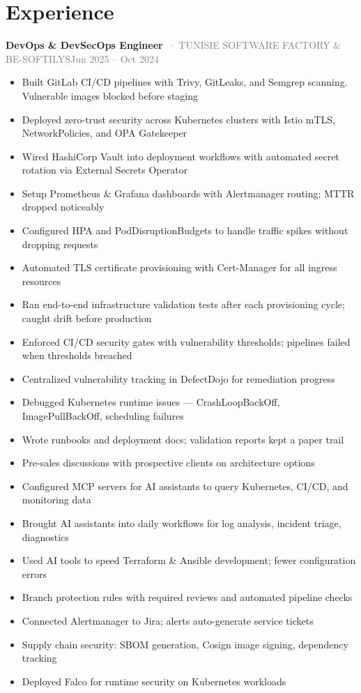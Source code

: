 \documentclass[10pt,a4paper]{article}
\newcommand{\cventry}[3]{\textbf{#1}\ \textcolor{graytext}{· #2}\hfill\textcolor{graytext}{\small #3}\par}
\begin{document}
\section*{Experience}
\cventry{DevOps \& DevSecOps Engineer}{TUNISIE SOFTWARE FACTORY \& BE-SOFTILYS}{Jun 2025 – Oct 2024}
\begin{itemize}
  \item Built GitLab CI/CD pipelines with Trivy, GitLeaks, and Semgrep scanning. Vulnerable images blocked before staging
  \item Deployed zero-trust security across Kubernetes clusters with Istio mTLS, NetworkPolicies, and OPA Gatekeeper
  \item Wired HashiCorp Vault into deployment workflows with automated secret rotation via External Secrets Operator
  \item Setup Prometheus \& Grafana dashboards with Alertmanager routing; MTTR dropped noticeably
  \item Configured HPA and PodDisruptionBudgets to handle traffic spikes without dropping requests
  \item Automated TLS certificate provisioning with Cert-Manager for all ingress resources
  \item Ran end-to-end infrastructure validation tests after each provisioning cycle; caught drift before production
  \item Enforced CI/CD security gates with vulnerability thresholds; pipelines failed when thresholds breached
  \item Centralized vulnerability tracking in DefectDojo for remediation progress
  \item Debugged Kubernetes runtime issues — CrashLoopBackOff, ImagePullBackOff, scheduling failures
  \item Wrote runbooks and deployment docs; validation reports kept a paper trail
  \item Pre-sales discussions with prospective clients on architecture options
  \item Configured MCP servers for AI assistants to query Kubernetes, CI/CD, and monitoring data
  \item Brought AI assistants into daily workflows for log analysis, incident triage, diagnostics
  \item Used AI tools to speed Terraform \& Ansible development; fewer configuration errors
  \item Branch protection rules with required reviews and automated pipeline checks
  \item Connected Alertmanager to Jira; alerts auto-generate service tickets
  \item Supply chain security: SBOM generation, Cosign image signing, dependency tracking
  \item Deployed Falco for runtime security on Kubernetes workloads
\end{itemize}
\end{document}
